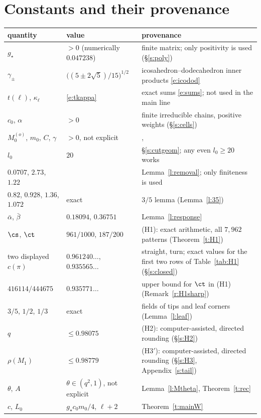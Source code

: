 \section{Constants and their provenance}\label{s:constants}

\begin{center}
\begin{tabular}{>{\raggedright\arraybackslash}p{}>{\raggedright\arraybackslash}p{}>{\raggedright\arraybackslash}p{}}
quantity & value & provenance \\
\hline
$g_\star$ & $> 0$ (numerically $0.047238$) & finite matrix; only positivity is used (\S\ref{s:poly}) \\
$\gamma_\pm$ & $\bigl((5 \pm 2\sqrt5)/15\bigr)^{1/2}$ & icosahedron--dodecahedron inner products \eqref{e:icodod} \\
$t(\ell)$, $\kappa_\ell$ & \eqref{e:tkappa} & exact sums \eqref{e:sums}; not used in the main line \\
$c_0$, $\alpha$ & $> 0$ & finite irreducible chains, positive weights (\S\ref{s:cells}) \\
$M_0^{(o)}$, $m_0$, $C$, $\gamma$ & $> 0$, not explicit & \cite[Theorem~2.1]{MOS94}, \cite[Theorem~4.1]{MO94} \\
$l_0$ & $20$ & \S\ref{s:cutgeom}; any even $l_0 \ge 20$ works \\
$0.0707$, $2.73$, $1.22$ & & Lemma~\ref{l:removal}; only finiteness is used \\
$0.82$, $0.928$, $1.36$, $1.072$ & exact & $3/5$ lemma (Lemma~\ref{l:35}) \\
$\bar\alpha$, $\bar\beta$ & $0.18094$, $0.36751$ & Lemma~\ref{l:response} \\
$\cs$, $\ct$ & $961/1000$, $187/200$ & (H1): exact arithmetic, all $7{,}962$ patterns (Theorem~\ref{t:H1}) \\
two displayed $c(\pi)$ & $0.961240\ldots$, $0.935565\ldots$ & straight, turn; exact values for the first two rows of Table~\ref{tab:H1} (\S\ref{s:closed}) \\
$416114/444675$ & $0.935771\ldots$ & upper bound for $\ct$ in (H1) (Remark~\ref{r:H1sharp}) \\
$3/5$, $1/2$, $1/3$ & exact & fields of tips and leaf corners (Lemma~\ref{l:leaf}) \\
$q$ & $\le 0.98075$ & (H2): computer-assisted, directed rounding (\S\ref{s:H2}) \\
$\rho(M_1)$ & $\le 0.98779$ & (H3$'$): computer-assisted, directed rounding (\S\ref{s:H3}, Appendix~\ref{s:tail}) \\
$\theta$, $A$ & $\theta \in (q^2, 1)$, not explicit & Lemma~\ref{l:Mtheta}, Theorem~\ref{t:rec} \\
$c$, $L_0$ & $g_\star c_0 m_0 / 4$, $\ell + 2$ & Theorem~\ref{t:mainW}
\end{tabular}
\end{center}
